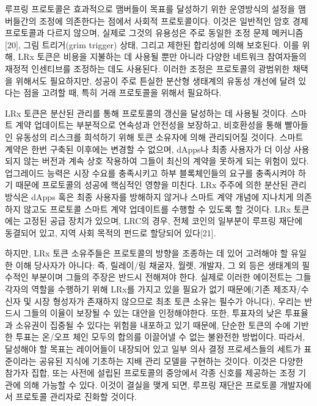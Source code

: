 \documentclass{article}
\begin{document}
\begin{multicols}{2}
루프링 프로토콜은 효과적으로 맴버들이 목표를 달성하기 위한 운영방식의 설정을 맴버들간의 조정에 의존한다는 점에서 사회적 프로토콜이다. 이것은 일반적인 암호 경제 프로토콜과 다르지 않으며, 실제로 그것의 유용성은 주로 동일한 조정 문제 메커니즘[20], 그림 트리거(grim trigger) 상태, 그리고 제한된 합리성에 의해 보호된다. 이를 위해, LRx 토큰은 비용을 지불하는 데 사용될 뿐만 아니라 다양한 네트워크 참여자들의 재정적 인센티브를 조정하는 데도 사용된다. 이러한 조정은 프로토콜의 광범위한 채택을 위해서도 필요하지만, 성공이 주로 튼실한 분산형 생태계의 유동성 개선에 달려 있다는 점을 고려할 때, 특히 거래 프로토콜을 위해서 필요하다.

LRx 토큰은 분산된 관리를 통해 프로토콜의 갱신을 달성하는 데 사용될 것이다. 스마트 계약 업데이트는 부분적으로 연속성과 안전성을 보장하고, 비호환성을 통해 빨아들인 유동성의 리스크를 희석하기 위해 토큰 소유자에 의해 관리되어질 것이다. 스마트 계약은 한번 구축된 이후에는 변경할 수 없으며, dApps나 최종 사용자가 더 이상 사용되지 않는 버전과 계속 상호 작용하여 그들이 최신의 계약을 못하게 되는 위험이 있다. 업그레이드 능력은 시장 수요를 충족시키고 하부 블록체인들의 요구를 충족시켜야 하기 때문에 프로토콜의 성공에 핵심적인 영향을 미친다.
LRx 주주에 의한 분산된 관리 방식은 dApps 혹은 최종 사용자를 방해하지 않거나 스마트 계약 개념에 지나치게 의존하지 않고도 프로토콜 스마트 계약 업데이트를 수행할 수 있도록 할 것이다. LRx 토큰에는 고정된 공급 장치가 있으며, LRC의 경우, 전체 코인의 일부분이 루프링 재단에 동결되어 있고, 지역 사회 목적의 펀드로 할당되어 있다[21].

하지만, LRx 토큰 소유주들은 프로토콜의 방향을 조종하는 데 있어 고려해야 할 유일한 이해 당사자가 아니다: 즉, 릴레이/링 채굴자, 월렛, 개발자, 그 외 등은 생태계의 필수적인 부분이며 그들의 주장은 반드시 전해져야 한다.  실제로 이러한 에이전트는 그들 각자의 역할을 수행하기 위해 LRx를 가지고 있을 필요가 없기 때문에(기존 제조자/수신자 및 시장 형성자가 존재하지 않으므로 최초 토큰 소유는 필수가 아니다), 우리는 반드시 그들의 이율이 보장될 수 있는 대안을 인정해야한다. 또한, 투표자의 낮은 투표율과 소유권이 집중될 수 있다는 위험을 내포하고 있기 때문에, 단순한 토큰의 수에 기반 한 투표는 온/오프 체인 모두의 합의를 이끌어낼 수 없는 불완전한 방법이다.  따라서, 달성해야 할 목표는 레이어들이 내장되어 있고 일부 의사 결정 프로세스들의 세트가 표준이라는 공유된 지식에 기초하는 지배 관리 모델을 구현하는 것이다.  이것은 다양한 참가자 집합, 또는 사전에 설립된 프로토콜의 중앙에서 각종 신호를 제공하는 조정 기관에 의해 가능할 수 있다. 이것이 결실을 맺게 되면, 루프링 재단은 프로토콜 개발자에서 프로토콜 관리자로 진화할 것이다.




\end{multicols}
\end{document}
